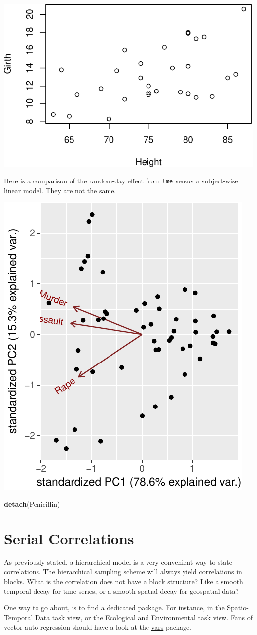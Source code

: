 \documentclass[]{book}
\newenvironment{Shaded}{\begin{snugshade}}{\end{snugshade}}
\newcommand{\KeywordTok}[1]{\textcolor[rgb]{0.13,0.29,0.53}{\textbf{#1}}}
\newcommand{\NormalTok}[1]{#1}
\theoremstyle{definition}
\theoremstyle{definition}
\theoremstyle{definition}
\theoremstyle{remark}
\begin{document}
\includegraphics[width=0.5\linewidth]{Rcourse_files/figure-latex/unnamed-chunk-196-1}

Here is a comparison of the random-day effect from \texttt{lme} versus a
subject-wise linear model. They are not the same.

\includegraphics[width=0.5\linewidth]{Rcourse_files/figure-latex/unnamed-chunk-197-1}

\begin{Shaded}
\begin{Highlighting}[]
\KeywordTok{detach}\NormalTok{(Penicillin)}
\end{Highlighting}
\end{Shaded}

\section{Serial Correlations}\label{serial}

As previously stated, a hierarchical model is a very convenient way to
state correlations. The hierarchical sampling scheme will always yield
correlations in blocks. What is the correlation does not have a block
structure? Like a smooth temporal decay for time-series, or a smooth
spatial decay for geospatial data?

One way to go about, is to find a dedicated package. For instance, in
the
\href{https://cran.r-project.org/web/views/SpatioTemporal.html}{Spatio-Temporal
Data} task view, or the
\href{https://cran.r-project.org/web/views/Environmetrics.html}{Ecological
and Environmental} task view. Fans of vector-auto-regression should have
a look at the \href{https://cran.r-project.org/package=vars}{vars}
package.
\end{document}
